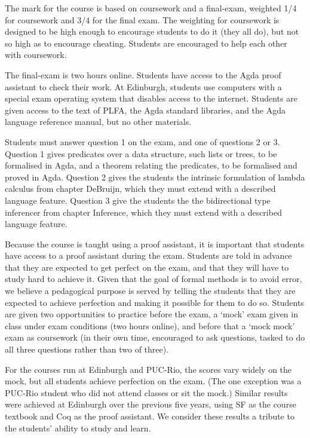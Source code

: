 \documentclass[preprint,authoryear]{elsarticle}
\begin{document}
The mark for the course is based on coursework and a final-exam,
weighted 1/4 for coursework and 3/4 for the final exam.  The weighting
for coursework is designed to be high enough to encourage students to
do it (they all do), but not so high as to encourage cheating.
Students are encouraged to help each other with coursework.

The final-exam is two hours online. Students have access to the Agda
proof assistant to check their work.  At Edinburgh, students use
computers with a special exam operating system that disables access
to the internet.  Students are given access to the text of PLFA,
the Agda standard libraries, and the Agda language reference manual,
but no other materials.

Students must answer question 1 on the exam, and one of questions 2 or
3.  Question 1 gives predicates over a data structure, such lists or
trees, to be formalised in Agda, and a theorem relating the
predicates, to be formalised and proved in Agda.  Question 2 gives the
students the intrinsic formulation of lambda calculus from chapter
DeBruijn, which they must extend with a described language feature.
Question 3 give the students the the bidirectional type inferencer
from chapter Inference, which they must extend with a described
language feature.

Because the course is taught using a proof assistant, it is important
that students have access to a proof assistant during the exam.
Students are told in advance that they are expected to get perfect on
the exam, and that they will have to study hard to achieve it.
Given that the goal of formal methods is to avoid error, we believe a
pedagogical purpose is served by telling the students that they are
expected to achieve perfection and making it possible for them to do
so.  Students are given two opportunities to practice before
the exam, a `mock' exam given in class under exam conditions (two
hours online), and before that a `mock mock' exam as coursework (in
their own time, encouraged to ask questions, tasked to do all three
questions rather than two of three).

For the courses run at Edinburgh and PUC-Rio, the scores vary
widely on the mock, but all students achieve perfection on the
exam.  (The one exception was a PUC-Rio student who did not attend
classes or sit the mock.)  Similar results were achieved at Edinburgh
over the previous five years, using SF as the course textbook and Coq
as the proof assistant.  We consider these results a tribute to the
students' ability to study and learn.
\end{document}
